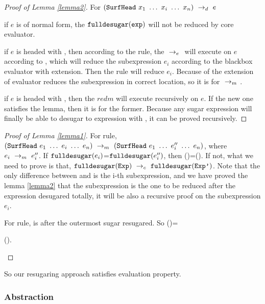 \begin{proof}[Proof of Lemma \ref{lemma2}]
For $(\mbox{\tt SurfHead}~x_1~\ldots~x_i~\ldots~x_n) ~\rightarrow_d~ e$

if $e$ is of normal form, the $\mbox{\tt fulldesugar}(\mbox{\tt exp})$ will not be reduced by core evaluator.

if $e$ is headed with , then according to the  rule, the $~\rightarrow_e~$ will execute on $e$ according to , which will reduce the subexpression $e_i$ according to the blackbox evaluator with extension. Then the  rule will reduce $e_i$. Because of the extension of evaluator reduces the subexpression in correct location, so it is for $~\rightarrow_m~$.

if $e$ is headed with , then the $redm{}{}$ will execute recursively on $e$. If the new one satisfies the lemma, then it is for the former. Because any sugar expression will finally be able to desugar to expression with , it can be proved recursively.
\end{proof}
\begin{proof}[Proof of Lemma \ref{lemma1}]
\hfill

For  rule, $(\mbox{\tt SurfHead}~e_1~\ldots~e_i~\ldots~e_n) ~\rightarrow_m~(\mbox{\tt SurfHead}~e_1~\ldots~e_i''~\ldots~e_n)$, where $e_i ~\rightarrow_m~e_i''$.
If $\mbox{\tt fulldesugar}(e_i)$=$\mbox{\tt fulldesugar}(e_i'')$, then ()=(). If not,  what we need to prove is that, $\mbox{\tt fulldesugar}(\mbox{\tt Exp}) ~\rightarrow_c~\mbox{\tt fulldesugar}(\mbox{\tt Exp'})$. Note that the only difference between  and  is the i-th subexpression, and we have proved the lemma \ref{lemma2} that the subexpression is the one to be reduced after the expression desugared totally, it will be also a recursive proof on the subexpression $e_i$.

For  rule,  is  after the outermost sugar resugared. So ()=

\begin{flushleft}
().
\end{flushleft}

\end{proof}

So our resugaring approach satisfies evaluation property.

\subsubsection{Abstraction}
\label{mark:abs}

